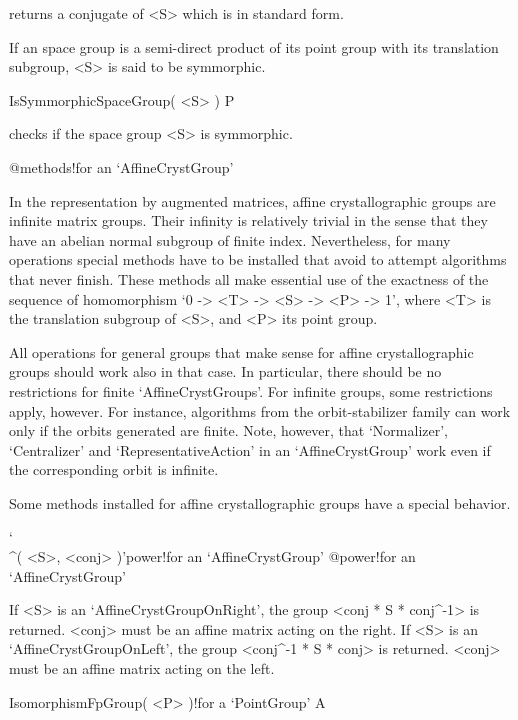 returns a conjugate of <S> which is in standard form.

If an space group is a semi-direct product of its point group with its
translation subgroup, <S> is said to be symmorphic.

\>IsSymmorphicSpaceGroup( <S> ) P

checks if the space group <S> is symmorphic.



%
{@methods!for an \noexpand`AffineCrystGroup'}

In the representation by augmented matrices, affine crystallographic 
groups are infinite matrix groups. Their infinity is relatively
trivial in the sense that they have an abelian normal subgroup of 
finite index. Nevertheless, for many operations special methods
have to be installed that avoid to attempt algorithms that never
finish. These methods all make essential use of the exactness of the
sequence of homomorphism `0 -> <T> -> <S> -> <P> -> 1', where
<T> is the translation subgroup of <S>, and <P> its point group.

All operations for general groups that make sense for affine
crystallographic groups should work also in that case. In 
particular, there should be no restrictions for finite 
`AffineCrystGroups'. For infinite groups, some restrictions 
apply, however. For instance, algorithms from the orbit-stabilizer 
family can work only if the orbits generated are finite. Note,
however, that `Normalizer', `Centralizer' and `RepresentativeAction'
in an `AffineCrystGroup' work even if the corresponding orbit is
infinite.

Some methods installed for affine crystallographic groups have
a special behavior.

\>`\\^( <S>, <conj> )'{power!for an `AffineCrystGroup'}%
@{power!for an `AffineCrystGroup'}

If <S> is an `AffineCrystGroupOnRight', the group <conj * S * conj^{-1}> 
is returned. <conj> must be an affine matrix acting on the right.
If <S> is an `AffineCrystGroupOnLeft', the group <conj^{-1} * S * conj> 
is returned. <conj> must be an affine matrix acting on the left.

\>IsomorphismFpGroup( <P> )!{for a `PointGroup'} A

